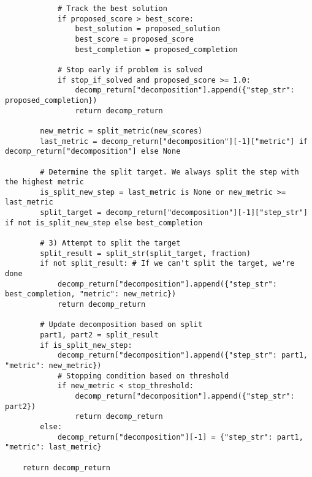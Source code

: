 \begin{tcolorbox}[colback=white, title=Python implementation of \decomp]
\begin{lstlisting}
            # Track the best solution
            if proposed_score > best_score:
                best_solution = proposed_solution
                best_score = proposed_score
                best_completion = proposed_completion

            # Stop early if problem is solved
            if stop_if_solved and proposed_score >= 1.0:
                decomp_return["decomposition"].append({"step_str": proposed_completion})
                return decomp_return

        new_metric = split_metric(new_scores)
        last_metric = decomp_return["decomposition"][-1]["metric"] if decomp_return["decomposition"] else None

        # Determine the split target. We always split the step with the highest metric
        is_split_new_step = last_metric is None or new_metric >= last_metric
        split_target = decomp_return["decomposition"][-1]["step_str"] if not is_split_new_step else best_completion

        # 3) Attempt to split the target
        split_result = split_str(split_target, fraction)
        if not split_result: # If we can't split the target, we're done
            decomp_return["decomposition"].append({"step_str": best_completion, "metric": new_metric})
            return decomp_return

        # Update decomposition based on split
        part1, part2 = split_result
        if is_split_new_step:
            decomp_return["decomposition"].append({"step_str": part1, "metric": new_metric})
            # Stopping condition based on threshold
            if new_metric < stop_threshold: 
                decomp_return["decomposition"].append({"step_str": part2})
                return decomp_return
        else:
            decomp_return["decomposition"][-1] = {"step_str": part1, "metric": last_metric}

    return decomp_return
\end{lstlisting}
\end{tcolorbox}
